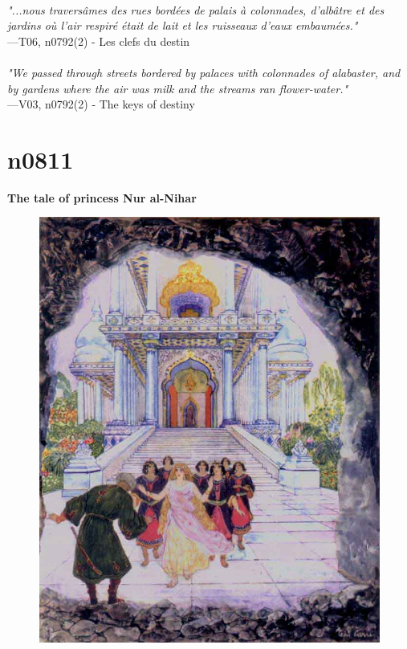\documentclass[../Carre_nights.tex]{subfiles}
\begin{document}
\textit{\\
"...nous traversâmes des rues bordées de palais à colonnades, d’albâtre et des jardins où l’air respiré était de lait et les ruisseaux d’eaux embaumées."} \\
—T06, n0792(2) - Les clefs du destin \\~\\
\textit{"We passed through streets bordered by palaces with colonnades of alabaster, and by gardens where the air was milk and the streams ran flower-water."} \\
—V03, n0792(2) - The keys of destiny

\newpage

\section{n0811}
\textbf{\Large{The tale of princess Nur al-Nihar}} \\

\begin{figure}[ht]
\centering
\includegraphics[height=\figsize]{illustrations/volume_6/T06, n0811 - Histoire de la princesse Nourennahar.jpg}
\end{figure}
\end{document}
